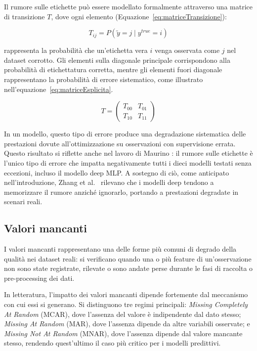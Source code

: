 \documentclass[../main.tex]{subfiles}
\begin{document}
Il rumore sulle etichette può essere modellato formalmente 
attraverso una matrice di transizione $T$, dove ogni elemento (Equazione~\ref{eq:matriceTransizione}):

\begin{equation}
    T_{ij} = P(\tilde{y} = j \mid y^{true} = i)
    \label{eq:matriceTransizione}
\end{equation}

rappresenta la probabilità che un'etichetta vera $i$ venga 
osservata come $j$ nel dataset corrotto. Gli elementi sulla 
diagonale principale corrispondono alla probabilità di 
etichettatura corretta, mentre gli elementi fuori diagonale 
rappresentano la probabilità di errore sistematico, come illustrato nell'equazione~\ref{eq:matriceEsplicita}.

\begin{equation}
T = \begin{pmatrix} T_{00} & T_{01} \\ T_{10} & T_{11} 
\end{pmatrix}
 \label{eq:matriceEsplicita}
\end{equation}

In un modello, questo tipo di errore produce una degradazione 
sistematica delle prestazioni dovute all'ottimizzazione su osservazioni con supervisione errata. Questo risultato si riflette anche nel lavoro di Maurino \cite{maurino2025data}: il rumore sulle etichette è l'unico tipo di errore che impatta negativamente tutti i dieci modelli testati senza eccezioni, incluso il modello deep MLP. A sostegno di ciò, come anticipato nell'introduzione, Zhang et al.~\cite{zhang2017understandingdeeplearningrequires} rilevano che i modelli deep tendono a memorizzare il rumore anziché ignorarlo, portando a prestazioni degradate in scenari reali.

\subsection{Valori mancanti}
I valori mancanti rappresentano una delle forme più comuni di degrado della qualità nei dataset reali: si verificano quando una o più feature di un'osservazione non sono state registrate, rilevate o sono andate perse durante le fasi di raccolta o pre-processing dei dati.

In letteratura, l'impatto dei valori mancanti dipende fortemente dal meccanismo con cui essi si generano. Si distinguono tre regimi principali: \textit{Missing Completely At Random} (MCAR), dove l'assenza del valore è indipendente dal dato stesso; \textit{Missing At Random} (MAR), dove l'assenza dipende da altre variabili osservate; e \textit{Missing Not At Random} (MNAR), dove l'assenza dipende dal valore mancante stesso, rendendo quest'ultimo il caso più critico per i modelli predittivi.
\end{document}
